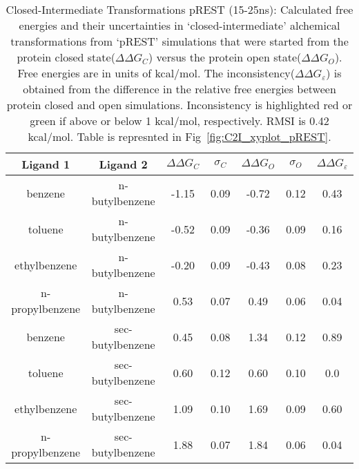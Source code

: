 \begin{table}[!htb]
\centering
\caption{Closed-Intermediate Transformations pREST (15-25ns):
 Calculated free energies and their uncertainties in `closed-intermediate' alchemical transformations from `pREST' simulations that were started from the protein closed state(\boldmath$\Delta\Delta G_{C}$) versus the protein open state(\boldmath$\Delta\Delta G_{O}$).
 Free energies are in units of kcal/mol. 
 The inconsistency(\boldmath$\Delta\Delta G_{\varepsilon}$) is obtained from the difference in the relative free energies between protein closed and open simulations. 
 Inconsistency is highlighted red or green if above or below 1 kcal/mol, respectively.
 RMSI is 0.42 kcal/mol.
 Table is represnted in Fig~\ref{fig:C2I_xyplot_pREST}.
}
\label{tbl:C-I_pRESText}
\begin{tabular}{|c|c|c|c|c|c|c|}
\hline
\textbf{Ligand 1}       & \textbf{Ligand 2}    & \boldmath$\Delta\Delta G_{C}$ & \boldmath$\sigma_{C}$ & \boldmath$\Delta\Delta G_{O}$ & \boldmath$\sigma_{O}$ & \boldmath$\Delta\Delta G_{\varepsilon}$ \\ \hline
benzene         & n-butylbenzene   & -1.15                                   & 0.09                       & -0.72                                & 0.12                       & \cellcolor[HTML]{9AFF99}0.43 \\ \hline
toluene         & n-butylbenzene   & -0.52                                  & 0.09                       & -0.36                                & 0.09                       & \cellcolor[HTML]{9AFF99}0.16 \\ \hline
ethylbenzene    & n-butylbenzene   & -0.20                                   & 0.09                       & -0.43                                & 0.08                       & \cellcolor[HTML]{9AFF99}0.23 \\ \hline
n-propylbenzene & n-butylbenzene   & 0.53                                  & 0.07                       & 0.49                                 & 0.06                       & \cellcolor[HTML]{9AFF99}0.04 \\ \hline
benzene         & sec-butylbenzene & 0.45                                   & 0.08                       & 1.34                                 & 0.12                       & \cellcolor[HTML]{9AFF99}0.89 \\ \hline
toluene         & sec-butylbenzene & 0.60                                   & 0.12                       & 0.60                                 & 0.10                       & \cellcolor[HTML]{9AFF99}0.0 \\ \hline
ethylbenzene    & sec-butylbenzene & 1.09                                   & 0.10                       & 1.69                                 & 0.09                       & \cellcolor[HTML]{9AFF99}0.60 \\ \hline
n-propylbenzene & sec-butylbenzene & 1.88                                   & 0.07                       & 1.84                                 & 0.06                       & \cellcolor[HTML]{9AFF99}0.04 \\ \hline
\end{tabular}
\end{table}



